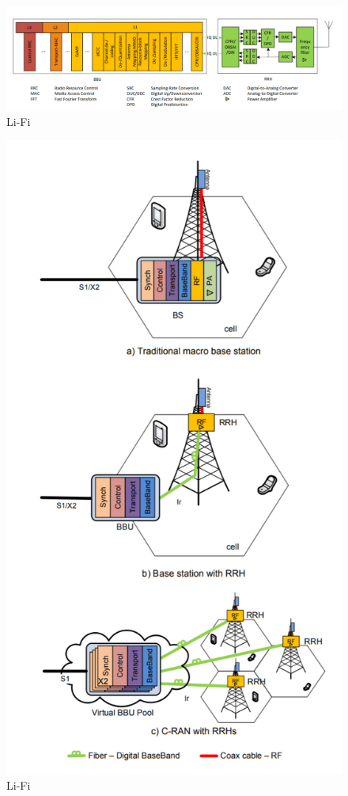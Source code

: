 \documentclass{article}
\begin{document}
\begin{figure}[!h]
  \includegraphics[width=\linewidth]{res/RRH_BBU_CRAN.PNG}
    \caption{Li-Fi}
  \label{fig:tech-illustration-li-fi}
\end{figure}

\begin{figure}
  \includegraphics[scale=0.5]{res/compare_arc_CRAN.PNG}
    \caption{Li-Fi}
  \label{fig:tech-illustration-li-fi}
\end{figure}
\end{document}
